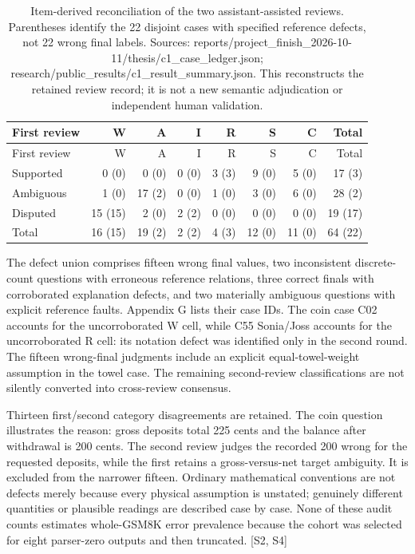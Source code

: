 \documentclass[12pt,a4paper]{report}
\begin{document}
\begin{longtable}[]{@{}lrrrrrrr@{}}
\caption{Item-derived reconciliation of the two assistant-assisted
reviews. Parentheses identify the 22 disjoint cases with specified
reference defects, not 22 wrong final labels. Sources:
reports/project\_\allowbreak{}finish\_\allowbreak{}2026-10-11/thesis/c1\_\allowbreak{}case\_\allowbreak{}ledger.json;
research/public\_results/c1\_\allowbreak{}result\_\allowbreak{}summary.json. This reconstructs the
retained review record; it is not a new semantic adjudication or
independent human validation.}\tabularnewline
\toprule\noalign{}
First review & W & A & I & R & S & C & Total \\
\midrule\noalign{}
\endfirsthead
\toprule\noalign{}
First review & W & A & I & R & S & C & Total \\
\midrule\noalign{}
\endhead
\bottomrule\noalign{}
\endlastfoot
Supported & 0 (0) & 0 (0) & 0 (0) & 3 (3) & 9 (0) & 5 (0) & 17 (3) \\
Ambiguous & 1 (0) & 17 (2) & 0 (0) & 1 (0) & 3 (0) & 6 (0) & 28 (2) \\
Disputed & 15 (15) & 2 (0) & 2 (2) & 0 (0) & 0 (0) & 0 (0) & 19 (17) \\
Total & 16 (15) & 19 (2) & 2 (2) & 4 (3) & 12 (0) & 11 (0) & 64 (22) \\
\end{longtable}

The defect union comprises fifteen wrong final values, two inconsistent
discrete-count questions with erroneous reference relations, three
correct finals with corroborated explanation defects, and two materially
ambiguous questions with explicit reference faults. Appendix G lists
their case IDs. The coin case C02 accounts for the uncorroborated W
cell, while C55 Sonia/Joss accounts for the uncorroborated R cell: its
notation defect was identified only in the second round. The fifteen
wrong-final judgments include an explicit equal-towel-weight assumption
in the towel case. The remaining second-review classifications are not
silently converted into cross-review consensus.

Thirteen first/second category disagreements are retained. The coin
question illustrates the reason: gross deposits total 225 cents and the
balance after withdrawal is 200 cents. The second review judges the
recorded 200 wrong for the requested deposits, while the first retains a
gross-versus-net target ambiguity. It is excluded from the narrower
fifteen. Ordinary mathematical conventions are not defects merely
because every physical assumption is unstated; genuinely different
quantities or plausible readings are described case by case. None of
these audit counts estimates whole-GSM8K error prevalence because the
cohort was selected for eight parser-zero outputs and then truncated.
{[}S2, S4{]}
\end{document}
